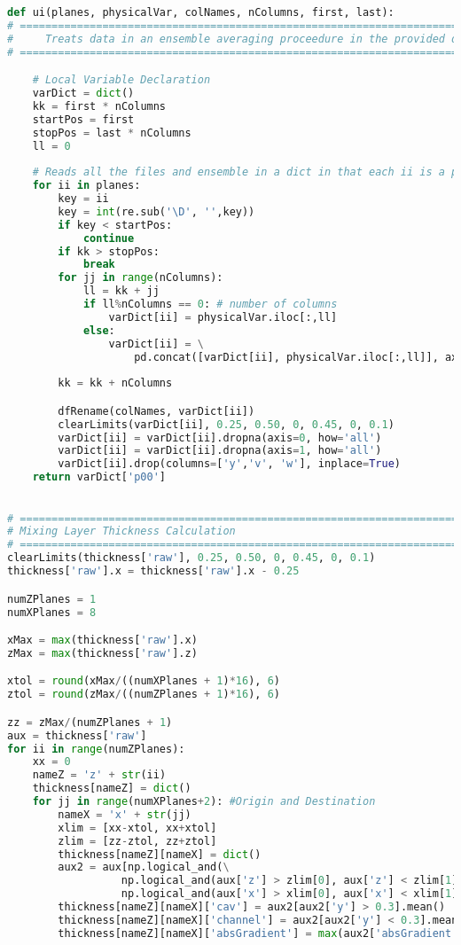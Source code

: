 \begin{lstlisting}[language=python]
def ui(planes, physicalVar, colNames, nColumns, first, last):
# =============================================================================
#     Treats data in an ensemble averaging proceedure in the provided direction
# =============================================================================

    # Local Variable Declaration
    varDict = dict()
    kk = first * nColumns
    startPos = first
    stopPos = last * nColumns
    ll = 0
  
    # Reads all the files and ensemble in a dict in that each ii is a plane
    for ii in planes:
        key = ii
        key = int(re.sub('\D', '',key))
        if key < startPos:
            continue
        if kk > stopPos: 
            break
        for jj in range(nColumns):
            ll = kk + jj
            if ll%nColumns == 0: # number of columns
                varDict[ii] = physicalVar.iloc[:,ll]
            else:
                varDict[ii] = \
                    pd.concat([varDict[ii], physicalVar.iloc[:,ll]], axis=1)
                    
        kk = kk + nColumns

        dfRename(colNames, varDict[ii])
        clearLimits(varDict[ii], 0.25, 0.50, 0, 0.45, 0, 0.1)
        varDict[ii] = varDict[ii].dropna(axis=0, how='all')
        varDict[ii] = varDict[ii].dropna(axis=1, how='all')
        varDict[ii].drop(columns=['y','v', 'w'], inplace=True)
    return varDict['p00']
    

# =============================================================================
# Mixing Layer Thickness Calculation
# =============================================================================
clearLimits(thickness['raw'], 0.25, 0.50, 0, 0.45, 0, 0.1)
thickness['raw'].x = thickness['raw'].x - 0.25

numZPlanes = 1
numXPlanes = 8

xMax = max(thickness['raw'].x)
zMax = max(thickness['raw'].z)

xtol = round(xMax/((numXPlanes + 1)*16), 6)
ztol = round(zMax/((numZPlanes + 1)*16), 6)

zz = zMax/(numZPlanes + 1)
aux = thickness['raw']
for ii in range(numZPlanes):
    xx = 0
    nameZ = 'z' + str(ii)
    thickness[nameZ] = dict()
    for jj in range(numXPlanes+2): #Origin and Destination
        nameX = 'x' + str(jj)
        xlim = [xx-xtol, xx+xtol]
        zlim = [zz-ztol, zz+ztol]
        thickness[nameZ][nameX] = dict()
        aux2 = aux[np.logical_and(\
                  np.logical_and(aux['z'] > zlim[0], aux['z'] < zlim[1]),\
                  np.logical_and(aux['x'] > xlim[0], aux['x'] < xlim[1]))]
        thickness[nameZ][nameX]['cav'] = aux2[aux2['y'] > 0.3].mean()
        thickness[nameZ][nameX]['channel'] = aux2[aux2['y'] < 0.3].mean()
        thickness[nameZ][nameX]['absGradient'] = max(aux2['absGradient'])
        

\end{lstlisting}
